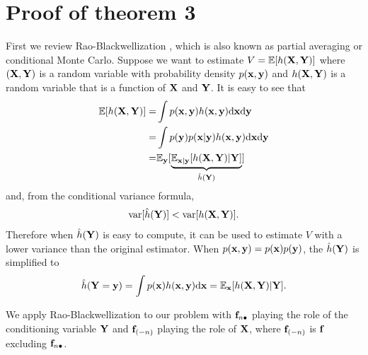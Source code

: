 \documentclass{article} %
\begin{document}
\section{Proof of theorem 3}
First we review Rao-Blackwellization \cite{casella1996rao}, which is also known as partial averaging or conditional Monte Carlo.
Suppose we want to estimate $V = \mathbb{E} [h(\mathbf{X},\mathbf{Y})]$ where $(\mathbf{X}, \mathbf{Y})$ is a random variable with probability density $p(\mathbf{x},\mathbf{y})$ and $h(\mathbf{X},\mathbf{Y})$ is a random variable that is a function of $\mathbf{X}$ and $\mathbf{Y}$. 
It is easy to see that 
\begin{align}
\mathbb{E} [h(\mathbf{X},\mathbf{Y})]
=& \int p(\mathbf{x}, \mathbf{y}) h(\mathbf{x}, \mathbf{y}) \mathrm{d} \mathbf{x} \mathrm{d} \mathbf{y} \\
=& \int p(\mathbf{y}) p(\mathbf{x} | \mathbf{y}) h(\mathbf{x}, \mathbf{y}) \mathrm{d} \mathbf{x} \mathrm{d} \mathbf{y} \\
=& \mathbb{E}_{\mathbf{y}} [ \underbrace{\mathbb{E}_{\mathbf{x} | \mathbf{y}} [h(\mathbf{X}, \mathbf{Y}) | \mathbf{Y}]}_{\hat h (\mathbf{Y})} ]
\end{align}
and, from the conditional variance formula,
\begin{align}
\text{var}[\hat h(\mathbf{Y})] < \text{var} [h(\mathbf{X},\mathbf{Y})].
\end{align}
Therefore when $\hat h(\mathbf{Y})$ is easy to compute, it can be used to estimate $V$ with a lower variance than the original estimator.
When $p(\mathbf{x},\mathbf{y}) = p(\mathbf{x}) p(\mathbf{y})$, the $\hat h(\mathbf{Y})$ is simplified to
\begin{align}
\hat h(\mathbf{Y} = \mathbf{y}) = \int p(\mathbf{x}) h(\mathbf{x}, \mathbf{y}) \mathrm{d} \mathbf{x} = \mathbb{E}_{\mathbf{x}} [h(\mathbf{X}, \mathbf{Y}) | \mathbf{Y}].
\end{align}

\newcommand{\fnn}{\f_{(-n)}}
We apply Rao-Blackwellization to our problem with $\mathbf{f}_{n \bullet}$ playing the role of the conditioning variable $\mathbf{Y}$ and $\fnn$ playing the role of $\mathbf{X}$, where $\fnn$ is $\mathbf{f}$ excluding $\mathbf{f}_{n \bullet}$.
\end{document}
